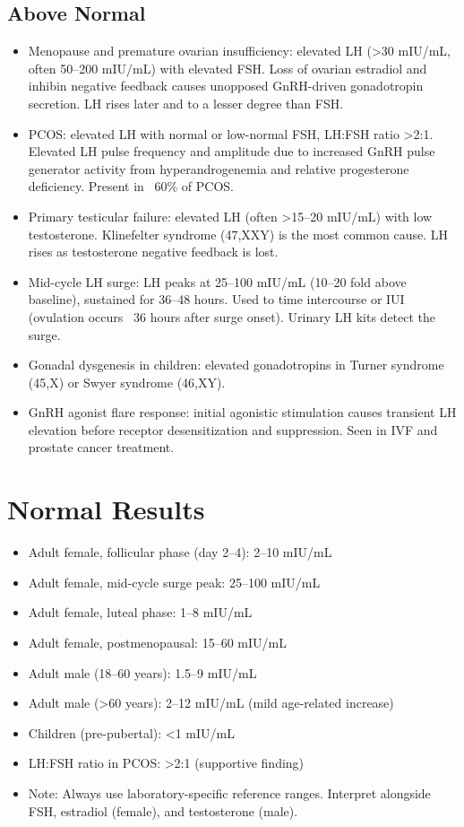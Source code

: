 \subsection*{Above Normal}
\begin{itemize}
  \item Menopause and premature ovarian insufficiency: elevated LH (>30 mIU/mL, often 50--200 mIU/mL) with elevated FSH. Loss of ovarian estradiol and inhibin negative feedback causes unopposed GnRH-driven gonadotropin secretion. LH rises later and to a lesser degree than FSH.
  \item PCOS: elevated LH with normal or low-normal FSH, LH:FSH ratio >2:1. Elevated LH pulse frequency and amplitude due to increased GnRH pulse generator activity from hyperandrogenemia and relative progesterone deficiency. Present in ~60\% of PCOS.
  \item Primary testicular failure: elevated LH (often >15--20 mIU/mL) with low testosterone. Klinefelter syndrome (47,XXY) is the most common cause. LH rises as testosterone negative feedback is lost.
  \item Mid-cycle LH surge: LH peaks at 25--100 mIU/mL (10--20 fold above baseline), sustained for 36--48 hours. Used to time intercourse or IUI (ovulation occurs ~36 hours after surge onset). Urinary LH kits detect the surge.
  \item Gonadal dysgenesis in children: elevated gonadotropins in Turner syndrome (45,X) or Swyer syndrome (46,XY).
  \item GnRH agonist flare response: initial agonistic stimulation causes transient LH elevation before receptor desensitization and suppression. Seen in IVF and prostate cancer treatment.
\end{itemize}

\section*{Normal Results}
\begin{itemize}
  \item Adult female, follicular phase (day 2--4): 2--10 mIU/mL
  \item Adult female, mid-cycle surge peak: 25--100 mIU/mL
  \item Adult female, luteal phase: 1--8 mIU/mL
  \item Adult female, postmenopausal: 15--60 mIU/mL
  \item Adult male (18--60 years): 1.5--9 mIU/mL
  \item Adult male (>60 years): 2--12 mIU/mL (mild age-related increase)
  \item Children (pre-pubertal): <1 mIU/mL
  \item LH:FSH ratio in PCOS: >2:1 (supportive finding)
  \item Note: Always use laboratory-specific reference ranges. Interpret alongside FSH, estradiol (female), and testosterone (male).
\end{itemize}

